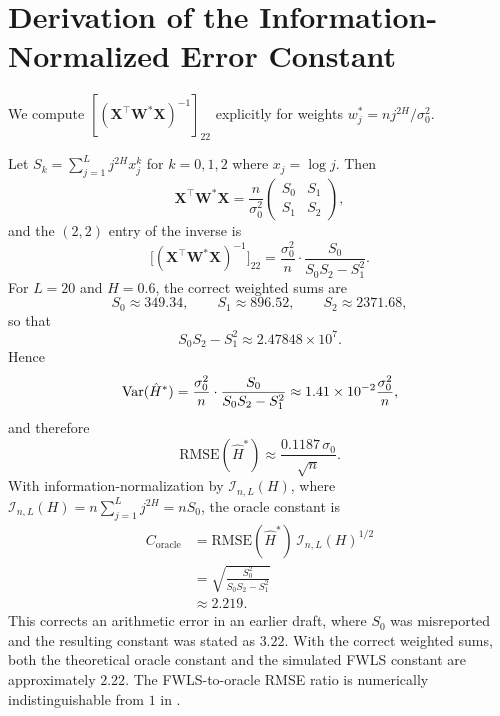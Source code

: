 \section{Derivation of the Information-Normalized Error Constant}
\label{app:rate-constant}

We compute $[(\mathbf{X}^\top \mathbf{W}^* \mathbf{X})^{-1}]_{22}$
explicitly for weights $w_j^* = n j^{2H}/\sigma_0^2$.

Let $S_k = \sum_{j=1}^L j^{2H} x_j^k$ for $k = 0, 1, 2$ where
$x_j = \log j$.  Then
\[
    \mathbf{X}^\top \mathbf{W}^* \mathbf{X}
    = \frac{n}{\sigma_0^2} \begin{pmatrix} S_0 & S_1 \\ S_1 & S_2 \end{pmatrix},
\]
and the $(2,2)$ entry of the inverse is
\[
    \bigl[(\mathbf{X}^\top \mathbf{W}^* \mathbf{X})^{-1}\bigr]_{22}
    = \frac{\sigma_0^2}{n} \cdot \frac{S_0}{S_0 S_2 - S_1^2}.
\]
For $L = 20$ and $H = 0.6$, the correct weighted sums are
\[
    S_0 \approx 349.34, \qquad
    S_1 \approx 896.52, \qquad
    S_2 \approx 2371.68,
\]
so that
\[
    S_0 S_2 - S_1^2 \approx 2.47848 \times 10^{7}.
\]
Hence
\[
    \mathrm{Var}(\hat H^*)
    = \frac{\sigma_0^2}{n} \cdot \frac{S_0}{S_0 S_2 - S_1^2}
    \approx 1.41 \times 10^{-2} \frac{\sigma_0^2}{n},
\]
and therefore
\[
    \mathrm{RMSE}(\hat H^*)
    \approx \frac{0.1187\,\sigma_0}{\sqrt n}.
\]
With information-normalization by $\mathcal I_{n,L}(H)$,
where $\mathcal I_{n,L}(H) = n\sum_{j=1}^L j^{2H} = n S_0$,
the oracle constant is
\begin{align*}
    C_{\mathrm{oracle}}
    &= \mathrm{RMSE}(\hat H^*)\,\mathcal I_{n,L}(H)^{1/2} \\
    &= \sqrt{\frac{S_0^2}{S_0 S_2 - S_1^2}} \\
    &\approx 2.219.
\end{align*}
This corrects an arithmetic error in an earlier draft, where $S_0$ was
misreported and the resulting constant was stated as $3.22$.
With the correct weighted sums, both the theoretical oracle constant and the
simulated FWLS constant are approximately $2.22$.
The FWLS-to-oracle RMSE ratio is numerically indistinguishable from $1$
in .
